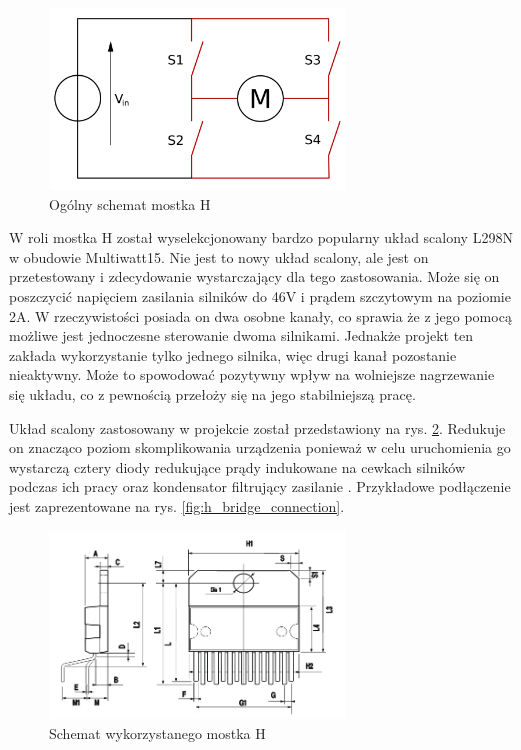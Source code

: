             \begin{figure}[ht]
                \centering
                \includegraphics[width=0.7\textwidth]{img/h_bridge_schametic.png}
                \caption{Ogólny schemat mostka H}
                \label{fig:h_bridge_schematic}
            \end{figure}
            
            W roli mostka H został wyselekcjonowany bardzo popularny układ scalony L298N w obudowie Multiwatt15. Nie jest to nowy układ scalony, ale jest on przetestowany i zdecydowanie wystarczający dla tego zastosowania. Może się on poszczycić napięciem zasilania silników do 46V i prądem szczytowym na poziomie 2A. W rzeczywistości posiada on dwa osobne kanały, co sprawia że z jego pomocą możliwe jest jednoczesne sterowanie dwoma silnikami. Jednakże projekt ten zakłada wykorzystanie tylko jednego silnika, więc drugi kanał pozostanie nieaktywny. Może to spowodować pozytywny wpływ na wolniejsze nagrzewanie się układu, co z pewnością przełoży się na jego stabilniejszą pracę. 
            
            Układ scalony zastosowany w projekcie został przedstawiony na rys. \ref{fig:h_bridge}. Redukuje on znacząco poziom skomplikowania urządzenia ponieważ w celu uruchomienia go wystarczą cztery diody redukujące prądy indukowane na cewkach silników podczas ich pracy oraz kondensator filtrujący zasilanie \cite{mostek}. Przykładowe podłączenie jest zaprezentowane na rys. \ref{fig:h_bridge_connection}.
            
            \begin{figure}[ht]
                \centering
                \includegraphics[width=0.7\textwidth]{img/h_bridge.png}
                \caption{Schemat wykorzystanego mostka H}
                \label{fig:h_bridge}
            \end{figure}
            
